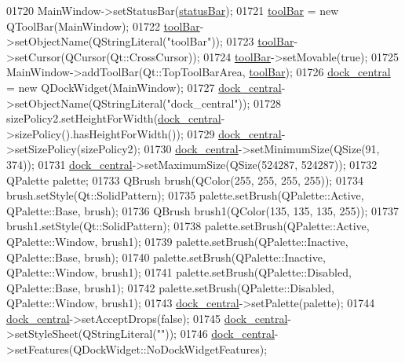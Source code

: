 \begin{DoxyCode}
01720         MainWindow->setStatusBar(\hyperlink{a00027_a50fa481337604bcc8bf68de18ab16ecd}{statusBar});
01721         \hyperlink{a00027_ab84dc49349f514d7b7d3fe8e78de069b}{toolBar} = \textcolor{keyword}{new} QToolBar(MainWindow);
01722         \hyperlink{a00027_ab84dc49349f514d7b7d3fe8e78de069b}{toolBar}->setObjectName(QStringLiteral(\textcolor{stringliteral}{"toolBar"}));
01723         \hyperlink{a00027_ab84dc49349f514d7b7d3fe8e78de069b}{toolBar}->setCursor(QCursor(Qt::CrossCursor));
01724         \hyperlink{a00027_ab84dc49349f514d7b7d3fe8e78de069b}{toolBar}->setMovable(\textcolor{keyword}{true});
01725         MainWindow->addToolBar(Qt::TopToolBarArea, \hyperlink{a00027_ab84dc49349f514d7b7d3fe8e78de069b}{toolBar});
01726         \hyperlink{a00027_a19105d0d919fa33b5f29f7677bbab054}{dock\_central} = \textcolor{keyword}{new} QDockWidget(MainWindow);
01727         \hyperlink{a00027_a19105d0d919fa33b5f29f7677bbab054}{dock\_central}->setObjectName(QStringLiteral(\textcolor{stringliteral}{"dock\_central"}));
01728         sizePolicy2.setHeightForWidth(\hyperlink{a00027_a19105d0d919fa33b5f29f7677bbab054}{dock\_central}->sizePolicy().hasHeightForWidth());
01729         \hyperlink{a00027_a19105d0d919fa33b5f29f7677bbab054}{dock\_central}->setSizePolicy(sizePolicy2);
01730         \hyperlink{a00027_a19105d0d919fa33b5f29f7677bbab054}{dock\_central}->setMinimumSize(QSize(91, 374));
01731         \hyperlink{a00027_a19105d0d919fa33b5f29f7677bbab054}{dock\_central}->setMaximumSize(QSize(524287, 524287));
01732         QPalette palette;
01733         QBrush brush(QColor(255, 255, 255, 255));
01734         brush.setStyle(Qt::SolidPattern);
01735         palette.setBrush(QPalette::Active, QPalette::Base, brush);
01736         QBrush brush1(QColor(135, 135, 135, 255));
01737         brush1.setStyle(Qt::SolidPattern);
01738         palette.setBrush(QPalette::Active, QPalette::Window, brush1);
01739         palette.setBrush(QPalette::Inactive, QPalette::Base, brush);
01740         palette.setBrush(QPalette::Inactive, QPalette::Window, brush1);
01741         palette.setBrush(QPalette::Disabled, QPalette::Base, brush1);
01742         palette.setBrush(QPalette::Disabled, QPalette::Window, brush1);
01743         \hyperlink{a00027_a19105d0d919fa33b5f29f7677bbab054}{dock\_central}->setPalette(palette);
01744         \hyperlink{a00027_a19105d0d919fa33b5f29f7677bbab054}{dock\_central}->setAcceptDrops(\textcolor{keyword}{false});
01745         \hyperlink{a00027_a19105d0d919fa33b5f29f7677bbab054}{dock\_central}->setStyleSheet(QStringLiteral(\textcolor{stringliteral}{""}));
01746         \hyperlink{a00027_a19105d0d919fa33b5f29f7677bbab054}{dock\_central}->setFeatures(QDockWidget::NoDockWidgetFeatures);

\end{DoxyCode}
